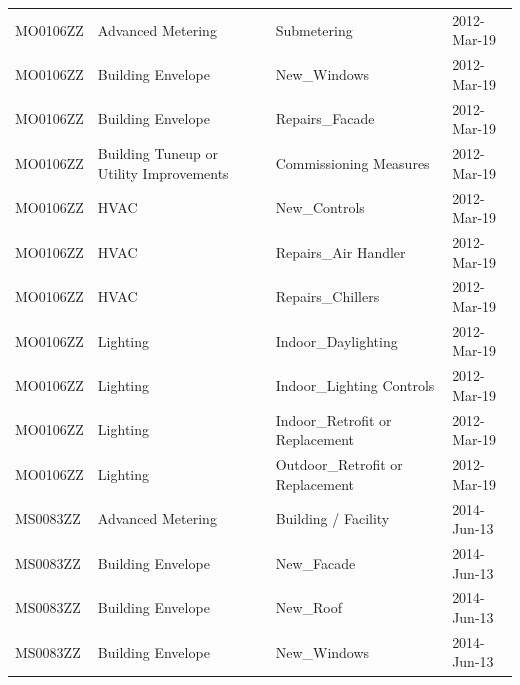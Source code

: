 \documentclass[12pt]{article}
\begin{document}
\begin{longtable}{lp{4cm}p{4cm}p{3cm}}
MO0106ZZ         & Advanced Metering                       & Submetering                               & 2012-Mar-19                   \\
MO0106ZZ         & Building Envelope                       & New\_Windows                              & 2012-Mar-19                   \\
MO0106ZZ         & Building Envelope                       & Repairs\_Facade                           & 2012-Mar-19                   \\
MO0106ZZ         & Building Tuneup or Utility Improvements & Commissioning Measures                    & 2012-Mar-19                   \\
MO0106ZZ         & HVAC                                    & New\_Controls                             & 2012-Mar-19                   \\
MO0106ZZ         & HVAC                                    & Repairs\_Air Handler                      & 2012-Mar-19                   \\
MO0106ZZ         & HVAC                                    & Repairs\_Chillers                         & 2012-Mar-19                   \\
MO0106ZZ         & Lighting                                & Indoor\_Daylighting                       & 2012-Mar-19                   \\
MO0106ZZ         & Lighting                                & Indoor\_Lighting Controls                 & 2012-Mar-19                   \\
MO0106ZZ         & Lighting                                & Indoor\_Retrofit or Replacement           & 2012-Mar-19                   \\
MO0106ZZ         & Lighting                                & Outdoor\_Retrofit or Replacement          & 2012-Mar-19                   \\
MS0083ZZ         & Advanced Metering                       & Building / Facility                       & 2014-Jun-13                   \\
MS0083ZZ         & Building Envelope                       & New\_Facade                               & 2014-Jun-13                   \\
MS0083ZZ         & Building Envelope                       & New\_Roof                                 & 2014-Jun-13                   \\
MS0083ZZ         & Building Envelope                       & New\_Windows                              & 2014-Jun-13                   \\

\end{longtable}
\end{document}
